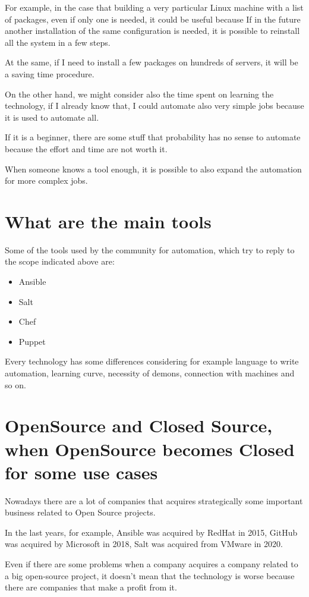 \documentclass[12pt,a4paper,openright,twoside]{book}
\begin{document}
For example, in the case that building a very particular Linux machine with a list of packages, even if only one is needed, it could be useful because If in the future another installation of the same configuration is needed, it is possible to reinstall all the system in a few steps.


At the same, if I need to install a few packages on hundreds of servers, it will be a saving time procedure.


On the other hand, we might consider also the time spent on learning the technology, if I already know that, I could automate also very simple jobs because it is used to automate all.


If it is a beginner, there are some stuff that probability has no sense to automate because the effort and time are not worth it.


When someone knows a tool enough, it is possible to also expand the automation for more complex jobs.

\section{What are the main tools}
Some of the tools used by the community for automation, which try to reply to the scope indicated above are:

\begin{itemize}
    \item Ansible
    \item Salt
    \item Chef
    \item Puppet
\end{itemize}

Every technology has some differences considering for example language to write automation, learning curve, necessity of demons, connection with machines and so on.

\section{OpenSource and Closed Source, when OpenSource becomes Closed for some use cases}
Nowadays there are a lot of companies that acquires strategically some important business related to Open Source projects.


In the last years, for example, Ansible was acquired by RedHat in 2015, GitHub was acquired by Microsoft in 2018, Salt was acquired from VMware in 2020.


Even if there are some problems when a company acquires a company related to a big open-source project, it doesn't mean that the technology is worse because there are companies that make a profit from it.
\end{document}
